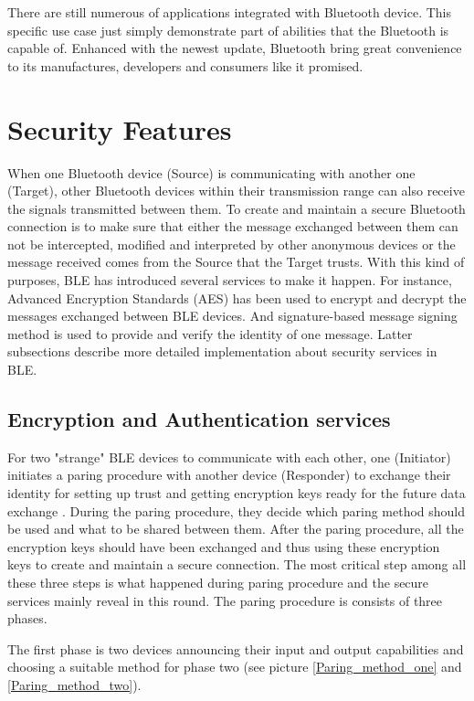 \documentclass{cseminar}
\begin{document}
There are still numerous of applications integrated with Bluetooth device. This specific use case just simply demonstrate part of abilities that the Bluetooth is capable of. Enhanced with the newest update, Bluetooth bring great convenience to its manufactures, developers and consumers like it promised.
\section{Security Features}
When one Bluetooth device (Source) is communicating with another one (Target), other Bluetooth devices within their transmission range can also receive the signals transmitted between them. To create and maintain a secure Bluetooth connection is to make sure that either the message exchanged between them can not be intercepted, modified and interpreted by other anonymous devices or the message received comes from the Source that the Target trusts. With this kind of purposes, BLE has introduced several services to make it happen. For instance, Advanced Encryption Standards (AES) has been used to encrypt and decrypt the messages exchanged between BLE devices. And signature-based message signing method is used to provide and verify the identity of one message. Latter subsections describe more detailed implementation about security services in BLE.
\subsection{Encryption and Authentication services}
For two "strange" BLE devices to communicate with each other, one (Initiator) initiates a paring procedure with another device (Responder) to exchange their identity for setting up trust and getting encryption keys ready for the future data exchange \cite{BLE_SE_PAIR}. During the paring procedure, they decide which paring method should be used and what to be shared between them. After the paring procedure, all the encryption keys should have been exchanged and thus using these encryption keys to create and maintain a secure connection. The most critical step among all these three steps is what happened during paring procedure and the secure services mainly reveal in this round. The paring procedure is consists of three phases.

The first phase is two devices announcing their input and output capabilities and choosing a suitable method for phase two \cite{BLE_PAPER} (see picture \ref{Paring_method_one} and \ref{Paring_method_two}).
\end{document}
